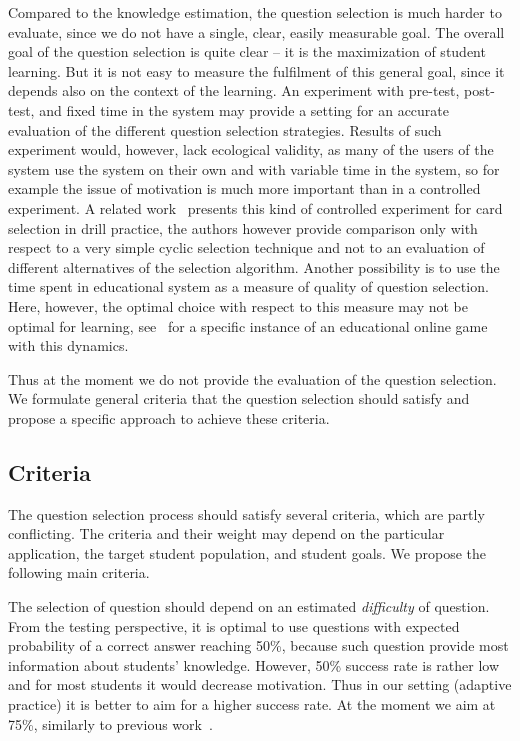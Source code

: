 \documentclass{edm_template}
\begin{document}
Compared to the knowledge estimation, the question selection is much harder to
evaluate, since we do not have a single, clear, easily measurable goal. The
overall goal of the question selection is quite clear -- it is the maximization
of student learning. But it is not easy to measure the fulfilment of this
general goal, since it depends also on the context of the learning. An
experiment with pre-test, post-test, and fixed time in the system may provide a
setting for an accurate evaluation of the different question selection
strategies. Results of such experiment would, however, lack ecological
validity, as many of the users of the system use the system on their own and
with variable time in the system, so for example the issue of motivation is
much more important than in a controlled experiment. A related
work~\cite{pavlik2008using} presents this kind of controlled experiment for
card selection in drill practice, the authors however provide comparison only
with respect to a very simple cyclic selection technique and not to an
evaluation of different alternatives of the selection algorithm. Another
possibility is to use the time spent in educational system as a measure of
quality of question selection. Here, however, the optimal choice with respect
to this measure may not be optimal for learning, see~\cite{lomas2013optimizing}
for a specific instance of an educational online game with this dynamics.

Thus at the moment we do not provide the evaluation of the question selection.
We formulate general criteria that the question selection should satisfy and
propose a specific approach to achieve these criteria.

\subsection{Criteria}

The question selection process should satisfy several criteria, which are
partly conflicting. The criteria and their weight may depend on the particular
application, the target student population, and student goals. We propose the
following main criteria.

The selection of question should depend on an estimated \emph{difficulty} of
question. From the testing perspective, it is optimal to use questions with
expected probability of a correct answer reaching 50\%, because such question
provide most information about students' knowledge. However, 50\% success rate
is rather low and for most students it would decrease motivation. Thus in our
setting (adaptive practice) it is better to aim for a higher success rate. At
the moment we aim at 75\%, similarly to previous
work~\cite{jansen2013influence}.
\end{document}
